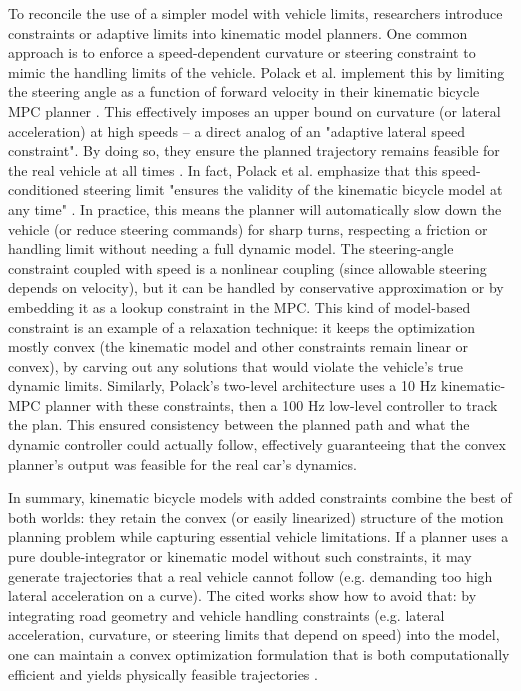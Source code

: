 To reconcile the use of a simpler model with vehicle limits, researchers introduce constraints or adaptive limits into kinematic model planners.
One common approach is to enforce a speed-dependent curvature or steering constraint to mimic the handling limits of the vehicle.
Polack et al.
implement this by limiting the steering angle as a function of forward velocity in their kinematic bicycle MPC planner \cite{polack_guaranteeing_2018}.
This effectively imposes an upper bound on curvature (or lateral acceleration) at high speeds – a direct analog of an "adaptive lateral speed
constraint".
By doing so, they ensure the planned trajectory remains feasible for the real vehicle at all times \cite{polack_guaranteeing_2018}.
In fact, Polack et al.
emphasize that this speed-conditioned steering limit "ensures the validity of the kinematic bicycle model at any time" \cite{polack_guaranteeing_2018}.
In practice, this means the planner will automatically slow down the vehicle (or reduce steering commands) for sharp turns, respecting a friction or
handling limit without needing a full dynamic model.
The steering-angle constraint coupled with speed is a nonlinear coupling (since allowable steering depends on velocity), but it can be handled by
conservative approximation or by embedding it as a lookup constraint in the MPC.
This kind of model-based constraint is an example of a relaxation technique: it keeps the optimization mostly convex (the kinematic model and other
constraints remain linear or convex), by carving out any solutions that would violate the vehicle's true dynamic limits.
Similarly, Polack's two-level architecture \cite{polack_guaranteeing_2018} uses a 10 Hz kinematic-MPC planner with these constraints, then a 100 Hz
low-level controller to track the plan.
This ensured consistency between the planned path and what the dynamic controller could actually follow, effectively guaranteeing that the convex
planner's output was feasible for the real car's dynamics.

In summary, kinematic bicycle models with added constraints combine the best of both worlds: they retain the convex (or easily linearized) structure
of the motion planning problem while capturing essential vehicle limitations.
If a planner uses a pure double-integrator or kinematic model without such constraints, it may generate trajectories that a real vehicle cannot
follow (e.g. demanding too high lateral acceleration on a curve).
The cited works show how to avoid that: by integrating road geometry and vehicle handling constraints (e.g. lateral acceleration, curvature, or
steering limits that depend on speed) into the model, one can maintain a convex optimization formulation that is both computationally efficient and
yields physically feasible trajectories \cite{polack_guaranteeing_2018,eilbrecht_challenges_2020}.

